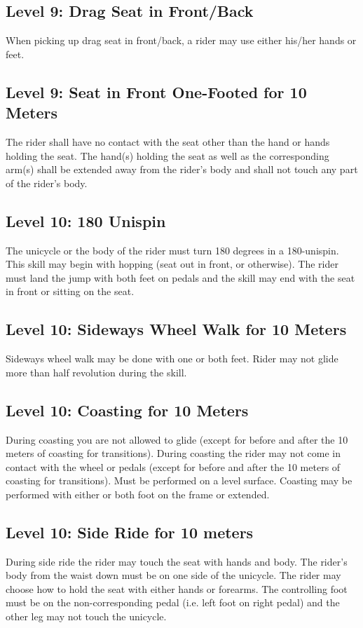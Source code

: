\subsection{Level 9: Drag Seat in Front/Back}
When picking up drag seat in front/back, a rider may use either his/her hands or feet.

\subsection{Level 9: Seat in Front One-Footed for 10 Meters}
The rider shall have no contact with the seat other than the hand or hands holding the seat. The hand(s) holding the seat
as well as the corresponding arm(s) shall be extended away from the rider’s body and shall not touch any part of the
rider's body.

\subsection{Level 10: 180 Unispin}
The unicycle or the body of the rider must turn 180 degrees in a 180-unispin. This skill may begin with hopping (seat
out in front, or otherwise). The rider must land the jump with both feet on pedals and the skill may end with the seat in
front or sitting on the seat.

\subsection{Level 10: Sideways Wheel Walk for 10 Meters}
Sideways wheel walk may be done with one or both feet. Rider may not glide more than half revolution during the skill.

\subsection{Level 10: Coasting for 10 Meters}
During coasting you are not allowed to glide (except for before and after the 10 meters of coasting for transitions).
During coasting the rider may not come in contact with the wheel or pedals (except for before and after the 10 meters
of coasting for transitions). Must be performed on a level surface. Coasting may be performed with either or both foot
on the frame or extended.

\subsection{Level 10: Side Ride for 10 meters}
During side ride the rider may touch the seat with hands and body. The rider's body from the waist down must be on
one side of the unicycle. The rider may choose how to hold the seat with either hands or forearms. The controlling foot
must be on the non-corresponding pedal (i.e. left foot on right pedal) and the other leg may not touch the unicycle.

